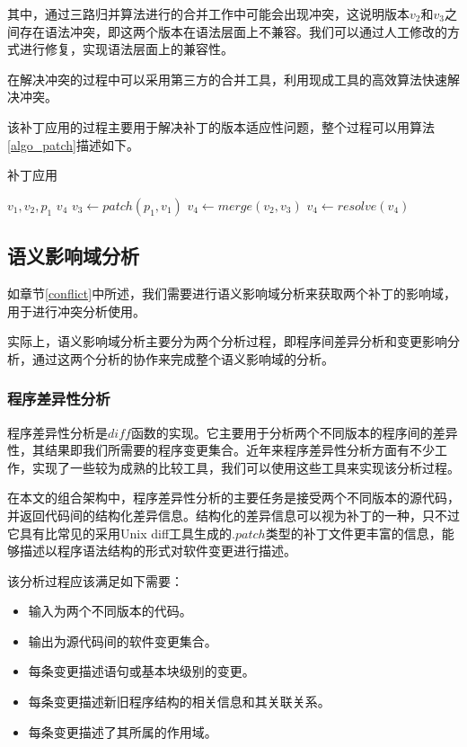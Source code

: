 其中，通过三路归并算法进行的合并工作中可能会出现冲突，这说明版本$v_2$和$v_3$之间存在语法冲突，即这两个版本在语法层面上不兼容。我们可以通过人工修改的方式进行修复，实现语法层面上的兼容性。

在解决冲突的过程中可以采用第三方的合并工具，利用现成工具的高效算法快速解决冲突。

该补丁应用的过程主要用于解决补丁的版本适应性问题，整个过程可以用算法\ref {algo_patch}描述如下。

\begin{algorithm}[H]
	\caption{补丁应用}
	\label{algo_patch}
	\begin{algorithmic}[1]
		\Require $v_1,v_2,p_1$
		\Ensure $v_4$
		\State $v_3 \gets patch(p_1,v_1)$
		\State $v_4 \gets merge(v_2,v_3)$
		\State $v_4 \gets resolve(v_4)$
		\State{}
		\State
			\State{}
		\EndFunction
		\State
			\State{}
		\EndFunction		
	\end{algorithmic}
\end{algorithm}

\subsection{语义影响域分析}
\label {sia}

如章节\ref {conflict}中所述，我们需要进行语义影响域分析来获取两个补丁的影响域，用于进行冲突分析使用。

实际上，语义影响域分析主要分为两个分析过程，即程序间差异分析和变更影响分析，通过这两个分析的协作来完成整个语义影响域的分析。

\subsubsection{程序差异性分析}

程序差异性分析是$diff$函数的实现。它主要用于分析两个不同版本的程序间的差异性，其结果即我们所需要的程序变更集合。近年来程序差异性分析方面有不少工作，实现了一些较为成熟的比较工具，我们可以使用这些工具来实现该分析过程。

在本文的组合架构中，程序差异性分析的主要任务是接受两个不同版本的源代码，并返回代码间的结构化差异信息。结构化的差异信息可以视为补丁的一种，只不过它具有比常见的采用Unix diff工具生成的$.patch$类型的补丁文件更丰富的信息，能够描述以程序语法结构的形式对软件变更进行描述。

该分析过程应该满足如下需要：
\begin{itemize}
	\item 输入为两个不同版本的代码。
	\item 输出为源代码间的软件变更集合。
	\item 每条变更描述语句或基本块级别的变更。
	\item 每条变更描述新旧程序结构的相关信息和其关联关系。
	\item 每条变更描述了其所属的作用域。
\end{itemize}

